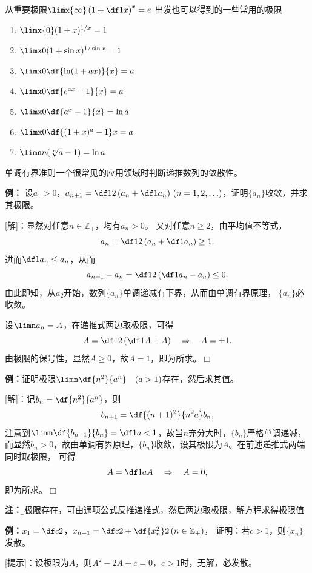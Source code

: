 从重要极限$\limx{\infty}\left(1+\df1x\right)^x=e$
出发也可以得到的一些常用的极限
\begin{thx}
\begin{enumerate}[(1)]
  \item $\limx{0}(1+x)^{1/x}=1$ 
  \item $\limx 0(1+\sin x)^{1/\sin x}=1$ 
  \item $\limx 0\df{\ln(1+ax)}{x}=a$
  \item $\limx 0\df{e^{ax}-1}{x}=a$ 
  \item $\limx 0\df{a^x-1}{x}=\ln a$ 
  \item $\limx 0\df{(1+x)^a-1}x=a$
  \item $\limn n(\sqrt[n]{a}-1)=\ln a$ 
\end{enumerate}
\end{thx}

单调有界准则一个很常见的应用领域时判断递推数列的敛散性。

{\bf 例：}
设$a_1>0$，$a_{n+1}=\df 12\left(a_n+\df 1{a_n}\right)\,
(n=1,2,\ldots)$，证明$\{a_n\}$收敛，并求其极限。

[解]：显然对任意$n\in\mathbb{Z}_+$，均有$a_n>0$。
又对任意$n\geq2$，由平均值不等式，
$$a_n=\df 12\left(a_n+\df 1{a_n}\right)\geq 1.$$
% 
% 
% 
进而$\df1{a_n}\leq a_n$，从而
$$a_{n+1}-a_n=\df12\left(\df1{a_n}-a_n\right)\leq0.$$
由此即知，从$a_2$开始，数列$\{a_n\}$单调递减有下界，从而由单调有界原理，
$\{a_n\}$必收敛。

设$\limn a_n=A$，在递推式两边取极限，可得
$$A=\df12\left(\df1A+A\right)\quad\Rightarrow\quad A=\pm1.$$
由极限的保号性，显然$A\geq0$，故$A=1$，即为所求。\hfill$\Box$

{\bf 例：}证明极限$\limn\df{n^2}{a^n}\quad (a>1)$存在，然后求其值。

[解]：记$b_n=\df{n^2}{a^n}$，则
$$b_{n+1}=\df{(n+1)^2}{n^2a}b_n,$$
注意到$\limn\df{b_{n+1}}{b_n}=\df1a<1$，故当$n$充分大时，$\{b_n\}$严格单调递减，
而显然$b_n>0$，故由单调有界原理，$\{b_n\}$收敛，设其极限为$A$。在前述递推式两端同时取极限，
可得
$$A=\df1aA\quad\Rightarrow\quad A=0,$$
即为所求。$\Box$

{\bf 注：}{\b 若极限存在，可由通项公式反推递推式，然后两边取极限，解方程求得极限值}

{\bf 例：}$x_1=\df c2$，$x_{n+1}=\df c2+\df{x_n^2}2\,(n\in\mathbb{Z}_+)$，
证明：若$c>1$，则$\{x_n\}$发散。

[提示]：设极限为$A$，则$A^2-2A+c=0$，$c>1$时，无解，必发散。

